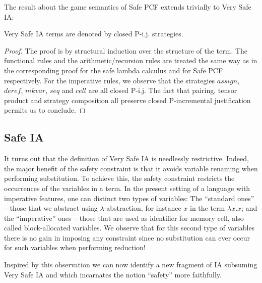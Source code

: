 The result about the game semantics of Safe PCF extends trivially to
Very Safe IA:
\begin{proposition}
  Very Safe IA terms are denoted by closed P-i.j. strategies.
\end{proposition}
\begin{proof}
The proof is by structural induction over the structure of the term.
The functional rules and the arithmetic/recursion rules are treated
the same way as in the corresponding proof for the safe lambda
calculus and for Safe PCF respectively. For the imperative rules, we
observe that the strategies $assign$, $deref$, $mkvar$, $seq$ and
$cell$ are all closed P-i.j. The fact that pairing, tensor product
and strategy composition all preserve closed P-incremental
justification permits us to conclude.
\end{proof}


\subsection{Safe IA}

It turns out that the definition of Very Safe IA is needlessly
restrictive. Indeed, the major benefit of the safety constraint is
that it avoids variable renaming when performing substitution. To
achieve this, the safety constraint restricts the occurrences of the
variables in a term. In the present setting of a language with
imperative features, one can distinct two types of variables: The
``standard ones'' -- those that we abstract using
$\lambda$-abstraction, for instance $x$ in the term $\lambda x . x$;
and the ``imperative'' ones -- those that are used as identifier for
memory cell, also called block-allocated variables. We observe that
for this second type of variables there is no gain in imposing any
constraint since no substitution can ever occur for such variables
when performing reduction!

Inspired by this observation we can now identify a new fragment of
IA subsuming Very Safe IA and which incarnates the notion ``safety''
 more faithfully.

